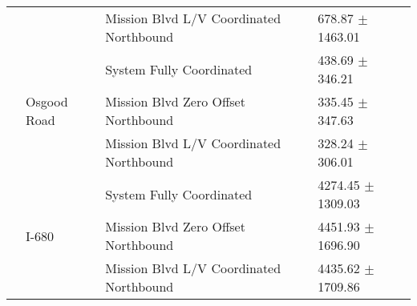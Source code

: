 \begin{tabular}{llll}
 &  & Mission Blvd L/V Coordinated Northbound & 678.87 $\pm$ 1463.01 \\
 & \multirow[t]{3}{*}{Osgood Road} & System Fully Coordinated & 438.69 $\pm$ 346.21 \\
 &  & Mission Blvd Zero Offset Northbound & 335.45 $\pm$ 347.63 \\
 &  & Mission Blvd L/V Coordinated Northbound & 328.24 $\pm$ 306.01 \\
 & \multirow[t]{3}{*}{I-680} & System Fully Coordinated & 4274.45 $\pm$ 1309.03 \\
 &  & Mission Blvd Zero Offset Northbound & 4451.93 $\pm$ 1696.90 \\
 &  & Mission Blvd L/V Coordinated Northbound & 4435.62 $\pm$ 1709.86 \\
\bottomrule
\end{tabular}
